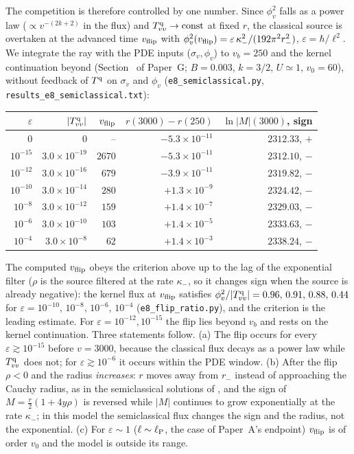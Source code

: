 \documentclass[11pt]{article}
\begin{document}
The competition is therefore controlled by one number. Since $\phi_v^2$ falls as a power law ($\propto v^{-(2k+2)}$ in the flux) and $T^{\rm q}_{vv}\to{\rm const}$ at fixed $r$, the classical source is overtaken at the advanced time $v_{\rm flip}$ with $\phi_v^2(v_{\rm flip})=\varepsilon\,\kappa_-^2/(192\pi^2r_-^2)$, $\varepsilon=\hbar/\ell^2$. We integrate the ray with the PDE inputs ($\sigma_v,\phi_v$) to $v_b=250$ and the kernel continuation beyond (Section~\Grayn{} of Paper~G; $B=0.003$, $k=3/2$, $U\simeq1$, $v_0=60$), without feedback of $T^{\rm q}$ on $\sigma_v$ and $\phi_v$ (\texttt{e8\_semiclassical.py}, \texttt{results\_e8\_semiclassical.txt}):
\begin{center}\small
\begin{tabular}{rrrrr}
$\varepsilon$ & $|T^{\rm q}_{vv}|$ & $v_{\rm flip}$ & $r(3000)-r(250)$ & $\ln|M|(3000)$, sign\\\hline
$0$ & $0$ & -- & $-5.3\times10^{-11}$ & $2312.33$, $+$\\
$10^{-15}$ & $3.0\times10^{-19}$ & $2670$ & $-5.3\times10^{-11}$ & $2312.10$, $-$\\
$10^{-12}$ & $3.0\times10^{-16}$ & $679$ & $-3.9\times10^{-11}$ & $2319.82$, $-$\\
$10^{-10}$ & $3.0\times10^{-14}$ & $280$ & $+1.3\times10^{-9}$ & $2324.42$, $-$\\
$10^{-8}$ & $3.0\times10^{-12}$ & $159$ & $+1.4\times10^{-7}$ & $2329.03$, $-$\\
$10^{-6}$ & $3.0\times10^{-10}$ & $103$ & $+1.4\times10^{-5}$ & $2333.63$, $-$\\
$10^{-4}$ & $3.0\times10^{-8}$ & $62$ & $+1.4\times10^{-3}$ & $2338.24$, $-$
\end{tabular}
\end{center}
The computed $v_{\rm flip}$ obeys the criterion above up to the lag of the exponential filter ($\rho$ is the source filtered at the rate $\kappa_-$, so it changes sign when the source is already negative): the kernel flux at $v_{\rm flip}$ satisfies $\phi_v^2/|T^{\rm q}_{vv}|=0.96,\,0.91,\,0.88,\,0.44$ for $\varepsilon=10^{-10},\,10^{-8},\,10^{-6},\,10^{-4}$ (\texttt{e8\_flip\_ratio.py}), and the criterion is the leading estimate. For $\varepsilon=10^{-12},10^{-15}$ the flip lies beyond $v_b$ and rests on the kernel continuation. Three statements follow. (a) The flip occurs for every $\varepsilon\gtrsim10^{-15}$ before $v=3000$, because the classical flux decays as a power law while $T^{\rm q}_{vv}$ does not; for $\varepsilon\gtrsim10^{-6}$ it occurs within the PDE window. (b) After the flip $\rho<0$ and the radius \emph{increases}: $r$ moves away from $r_-$ instead of approaching the Cauchy radius, as in the semiclassical solutions of \citet{Barcelo2022}, and the sign of $M=\tfrac r2(1+4y\rho)$ is reversed while $|M|$ continues to grow exponentially at the rate $\kappa_-$; in this model the semiclassical flux changes the sign and the radius, not the exponential. (c) For $\varepsilon\sim1$ ($\ell\sim\ell_{\rm P}$, the case of Paper~A's endpoint) $v_{\rm flip}$ is of order $v_0$ and the model is outside its range.
\end{document}
